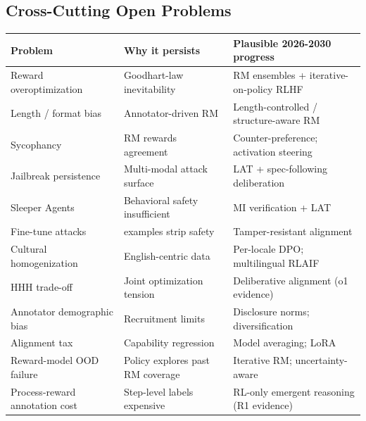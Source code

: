 \subsection{Cross-Cutting Open Problems}\label{cross-cutting-open-problems}

{\def\LTcaptype{none} %
\begin{longtable}[]{@{}
  >{\raggedright\arraybackslash}p{}
  >{\raggedright\arraybackslash}p{}
  >{\raggedright\arraybackslash}p{}@{}}
\toprule\noalign{}
\begin{minipage}[b]{\linewidth}\raggedright
Problem
\end{minipage} & \begin{minipage}[b]{\linewidth}\raggedright
Why it persists
\end{minipage} & \begin{minipage}[b]{\linewidth}\raggedright
Plausible 2026-2030 progress
\end{minipage} \\
\midrule\noalign{}
\endhead
\bottomrule\noalign{}
\endlastfoot
Reward overoptimization & Goodhart-law inevitability & RM ensembles + iterative-on-policy RLHF \\
Length / format bias & Annotator-driven RM & Length-controlled / structure-aware RM \\
Sycophancy & RM rewards agreement & Counter-preference; activation steering \\
Jailbreak persistence & Multi-modal attack surface & LAT + spec-following deliberation \\
Sleeper Agents & Behavioral safety insufficient & MI verification + LAT \\
Fine-tune attacks & 10 examples strip safety & Tamper-resistant alignment \\
Cultural homogenization & English-centric data & Per-locale DPO; multilingual RLAIF \\
HHH trade-off & Joint optimization tension & Deliberative alignment (o1 evidence) \\
Annotator demographic bias & Recruitment limits & Disclosure norms; diversification \\
Alignment tax & Capability regression & Model averaging; LoRA \\
Reward-model OOD failure & Policy explores past RM coverage & Iterative RM; uncertainty-aware \\
Process-reward annotation cost & Step-level labels expensive & RL-only emergent reasoning (R1 evidence) \\

\end{longtable}}
